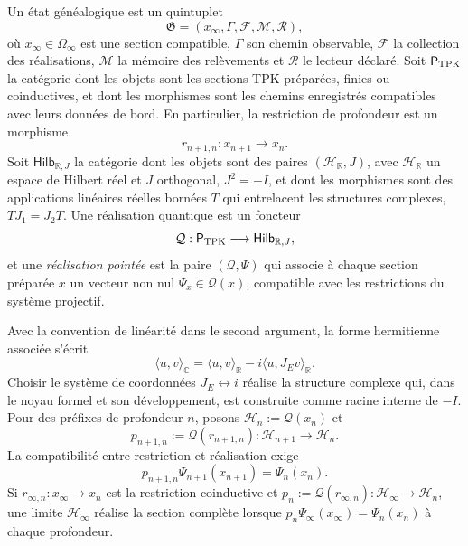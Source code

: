 \begin{definition}
\label{v:rec:realizacion_evolucion:statement:01}
Un état généalogique est un quintuplet
\begin{equation}
 \mathfrak G=(x_\infty,\Gamma,\mathcal F,\mathcal M,\mathcal R),
 \label{v:rec:eq:estado-genealogico-realizado-rev2}
\end{equation}
où \(x_\infty\in\Omega_\infty\) est une section compatible,
\(\Gamma\) son chemin observable, \(\mathcal F\) la collection des réalisations,
\(\mathcal M\) la mémoire des relèvements et \(\mathcal R\) le lecteur
déclaré. Soit \(\mathsf P_{\rm TPK}\) la catégorie dont les objets sont les
sections TPK préparées, finies ou coinductives, et dont les morphismes sont les
chemins enregistrés compatibles avec leurs données de bord. En particulier, la
restriction de profondeur est un morphisme
\[
 r_{n+1,n}:x_{n+1}\longrightarrow x_n.
\]
Soit \(\mathsf{Hilb}_{\mathbb R,J}\) la catégorie dont les objets
sont des paires \((\mathcal H_{\mathbb R},J)\), avec \(\mathcal H_{\mathbb R}\)
un espace de Hilbert réel et \(J\) orthogonal, \(J^2=-I\), et dont les morphismes sont
des applications linéaires réelles bornées \(T\) qui entrelacent les structures
complexes, \(TJ_1=J_2T\). Une réalisation quantique est un foncteur
\[
 \mathcal Q:\mathsf P_{\rm TPK}\longrightarrow
 \mathsf{Hilb}_{\mathbb R,J},
\]
et une \emph{réalisation pointée} est la paire \((\mathcal Q,\Psi)\) qui associe
à chaque section préparée \(x\) un vecteur non nul
\(\Psi_x\in\mathcal Q(x)\), compatible avec les restrictions du système
projectif.
\end{definition}

Avec la convention de linéarité dans le second argument, la forme hermitienne associée
s’écrit
\[
 \langle u,v\rangle_{\mathbb C}
 =\langle u,v\rangle_{\mathbb R}
  -i\langle u,J_E v\rangle_{\mathbb R}.
\]
Choisir le système de coordonnées \(J_E\leftrightarrow i\) réalise la structure complexe qui,
dans le noyau formel et son développement, est construite comme racine interne de \(-I\). Pour des préfixes de
profondeur \(n\), posons
\(\mathcal H_n:=\mathcal Q(x_n)\) et
\[
 p_{n+1,n}:=\mathcal Q(r_{n+1,n}):
 \mathcal H_{n+1}\longrightarrow\mathcal H_n.
\]
La compatibilité entre restriction et réalisation exige
\begin{equation}
 p_{n+1,n}\Psi_{n+1}(x_{n+1})=\Psi_n(x_n).
 \label{v:rec:eq:compatibilidad-realizacion-hilbert-rev2}
\end{equation}
Si \(r_{\infty,n}:x_\infty\to x_n\) est la restriction coinductive et
\(p_n:=\mathcal Q(r_{\infty,n}):\mathcal H_\infty\to\mathcal H_n\), une
limite \(\mathcal H_\infty\) réalise la section complète lorsque
\(p_n\Psi_\infty(x_\infty)=\Psi_n(x_n)\) à chaque profondeur.

